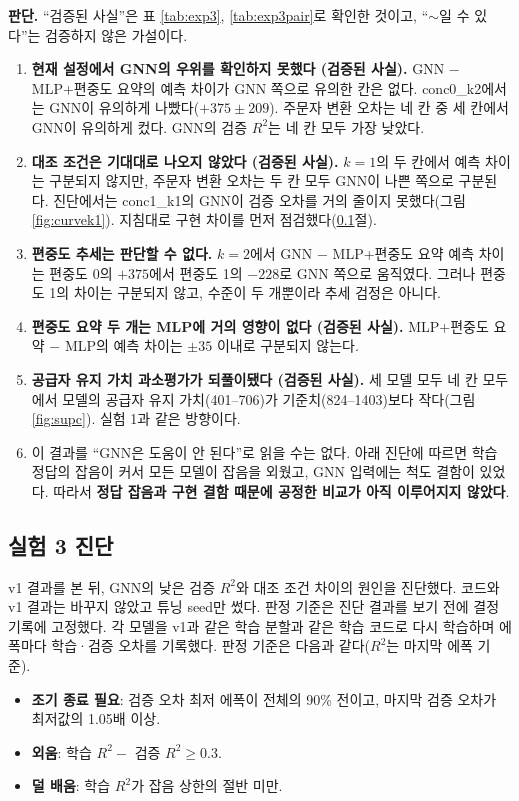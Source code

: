 \documentclass[11pt,a4paper]{article}
\begin{document}
\textbf{판단.} ``검증된 사실''은 표 \ref{tab:exp3}, \ref{tab:exp3pair}로 확인한 것이고, ``$\sim$일 수 있다''는 검증하지 않은 가설이다.
\begin{enumerate}[leftmargin=1.5em]
  \item \textbf{현재 설정에서 GNN의 우위를 확인하지 못했다 (검증된 사실).} GNN $-$ MLP+편중도 요약의 예측 차이가 GNN 쪽으로
        유의한 칸은 없다. conc0\_k2에서는 GNN이 유의하게 나빴다($+375\pm209$). 주문자 변환 오차는 네 칸 중 세 칸에서 GNN이 유의하게 컸다.
        GNN의 검증 $R^2$는 네 칸 모두 가장 낮았다.
  \item \textbf{대조 조건은 기대대로 나오지 않았다 (검증된 사실).} $k=1$의 두 칸에서 예측 차이는 구분되지 않지만,
        주문자 변환 오차는 두 칸 모두 GNN이 나쁜 쪽으로 구분된다. 진단에서는 conc1\_k1의 GNN이 검증 오차를 거의 줄이지 못했다(그림 \ref{fig:curvek1}). 지침대로 구현 차이를 먼저 점검했다(\ref{sec:exp3diag}절).
  \item \textbf{편중도 추세는 판단할 수 없다.} $k=2$에서 GNN $-$ MLP+편중도 요약 예측 차이는 편중도 0의 $+375$에서 편중도 1의 $-228$로
        GNN 쪽으로 움직였다. 그러나 편중도 1의 차이는 구분되지 않고, 수준이 두 개뿐이라 추세 검정은 아니다.
  \item \textbf{편중도 요약 두 개는 MLP에 거의 영향이 없다 (검증된 사실).} MLP+편중도 요약 $-$ MLP의 예측 차이는 $\pm35$ 이내로 구분되지 않는다.
  \item \textbf{공급자 유지 가치 과소평가가 되풀이됐다 (검증된 사실).} 세 모델 모두 네 칸 모두에서 모델의 공급자 유지 가치(401--706)가
        기준치(824--1403)보다 작다(그림 \ref{fig:supc}). 실험 1과 같은 방향이다.
  \item 이 결과를 ``GNN은 도움이 안 된다''로 읽을 수는 없다. 아래 진단에 따르면 학습 정답의 잡음이 커서 모든 모델이 잡음을 외웠고,
        GNN 입력에는 척도 결함이 있었다. 따라서 \textbf{정답 잡음과 구현 결함 때문에 공정한 비교가 아직 이루어지지 않았다}.
\end{enumerate}

\subsection{실험 3 진단}\label{sec:exp3diag}

v1 결과를 본 뒤, GNN의 낮은 검증 $R^2$와 대조 조건 차이의 원인을 진단했다. 코드와 v1 결과는 바꾸지 않았고 튜닝 seed만 썼다.
판정 기준은 진단 결과를 보기 전에 결정 기록에 고정했다. 각 모델을 v1과 같은 학습 분할과 같은 학습 코드로 다시 학습하며 에폭마다
학습·검증 오차를 기록했다. 판정 기준은 다음과 같다($R^2$는 마지막 에폭 기준).
\begin{itemize}[leftmargin=1.5em]
  \item \textbf{조기 종료 필요}: 검증 오차 최저 에폭이 전체의 90\% 전이고, 마지막 검증 오차가 최저값의 1.05배 이상.
  \item \textbf{외움}: 학습 $R^2 -$ 검증 $R^2 \ge 0.3$.
  \item \textbf{덜 배움}: 학습 $R^2$가 잡음 상한의 절반 미만.
\end{itemize}
\end{document}
